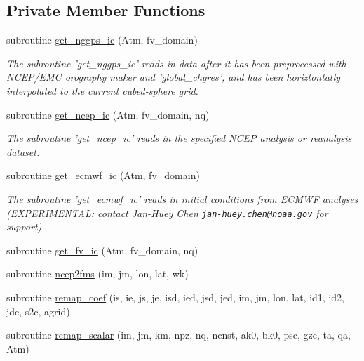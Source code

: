 \subsection*{Private Member Functions}
\begin{DoxyCompactItemize}
\item 
subroutine \hyperlink{classexternal__ic__mod_a2c8c50c3ce254d69f0dfb1026fd79894}{get\-\_\-nggps\-\_\-ic} (Atm, fv\-\_\-domain)
\begin{DoxyCompactList}\small\item\em The subroutine 'get\-\_\-nggps\-\_\-ic' reads in data after it has been preprocessed with N\-C\-E\-P/\-E\-M\-C orography maker and 'global\-\_\-chgres', and has been horiztontally interpolated to the current cubed-\/sphere grid. \end{DoxyCompactList}\item 
subroutine \hyperlink{classexternal__ic__mod_a24b0b354bf5843b10cd1e14cb7cd9bbf}{get\-\_\-ncep\-\_\-ic} (Atm, fv\-\_\-domain, nq)
\begin{DoxyCompactList}\small\item\em The subroutine 'get\-\_\-ncep\-\_\-ic' reads in the specified N\-C\-E\-P analysis or reanalysis dataset. \end{DoxyCompactList}\item 
subroutine \hyperlink{classexternal__ic__mod_a8e1069d292da6b506720069397105f44}{get\-\_\-ecmwf\-\_\-ic} (Atm, fv\-\_\-domain)
\begin{DoxyCompactList}\small\item\em The subroutine 'get\-\_\-ecmwf\-\_\-ic' reads in initial conditions from E\-C\-M\-W\-F analyses (E\-X\-P\-E\-R\-I\-M\-E\-N\-T\-A\-L\-: contact Jan-\/\-Huey Chen \href{mailto:jan-huey.chen@noaa.gov}{\tt jan-\/huey.\-chen@noaa.\-gov} for support) \end{DoxyCompactList}\item 
subroutine \hyperlink{classexternal__ic__mod_a81751fea2cd62527be34c1a4822b7b82}{get\-\_\-fv\-\_\-ic} (Atm, fv\-\_\-domain, nq)
\item 
subroutine \hyperlink{classexternal__ic__mod_a008a0c5b5b6c2f99f3fbfad087e2f3b0}{ncep2fms} (im, jm, lon, lat, wk)
\item 
subroutine \hyperlink{classexternal__ic__mod_a2dd0919c9e603f7576f32f372603d378}{remap\-\_\-coef} (is, ie, js, je, isd, ied, jsd, jed, im, jm, lon, lat, id1, id2, jdc, s2c, agrid)
\item 
subroutine \hyperlink{classexternal__ic__mod_a52d3cb132633e41f7589ef7e2e9c06c9}{remap\-\_\-scalar} (im, jm, km, npz, nq, ncnst, ak0, bk0, psc, gzc, ta, qa, Atm)

\end{DoxyCompactItemize}
